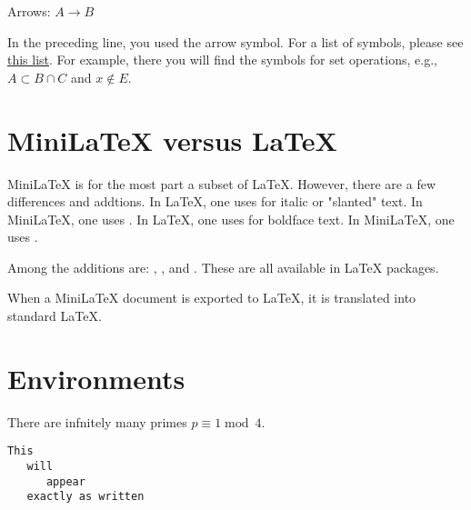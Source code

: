 Arrows: $A \to B$

In the preceding line, you used the arrow symbol.  For a list of symbols, please see
\href{https://artofproblemsolving.com/wiki/index.php/LaTeX:Symbols}{this list}.  For example, there you will find the symbols for set operations, e.g., $A \subset B \cap C$ and $x \not\in E$.

\section{MiniLaTeX versus LaTeX}

MiniLaTeX is for the most part a subset of LaTeX.  However, there are a few differences and addtions.  In LaTeX, one uses  for italic or "slanted" text.  In MiniLaTeX, one uses .   In LaTeX, one uses  for boldface text.  In MiniLaTeX, one uses .

Among the additions are: , ,  and .  These are all available in LaTeX packages.

When a MiniLaTeX document is exported to LaTeX, it is translated into  standard LaTeX.

\section{Environments}

\begin{theorem}
\label{thm-primes}
There are infnitely many primes $p \equiv 1 \mathop{mod}\ 4$.
\end{theorem}

\begin{verbatim}
This
   will
      appear
   exactly as written
\end{verbatim}
